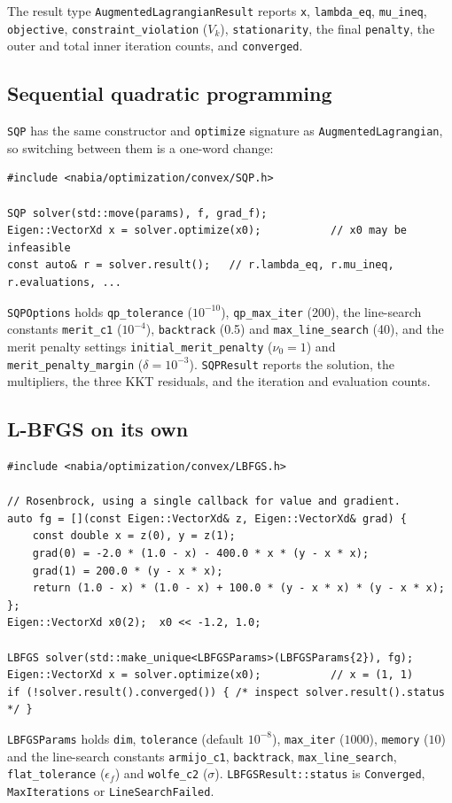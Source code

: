 \documentclass[11pt,a4paper]{article}
\begin{document}
The result type \texttt{AugmentedLagrangianResult} reports \texttt{x},
\texttt{lambda\_eq}, \texttt{mu\_ineq}, \texttt{objective},
\texttt{constraint\_violation} ($V_k$),
\texttt{stationarity}, the final \texttt{penalty}, the outer and total inner
iteration counts, and \texttt{converged}.

\subsection{Sequential quadratic programming}
\texttt{SQP} has the same constructor and
\texttt{optimize} signature as \texttt{AugmentedLagrangian}, so switching
between them is a one-word change:
\begin{lstlisting}
#include <nabia/optimization/convex/SQP.h>

SQP solver(std::move(params), f, grad_f);
Eigen::VectorXd x = solver.optimize(x0);           // x0 may be infeasible
const auto& r = solver.result();   // r.lambda_eq, r.mu_ineq, r.evaluations, ...
\end{lstlisting}
\texttt{SQPOptions} holds \texttt{qp\_tolerance} ($10^{-10}$), \texttt{qp\_max\_iter} (200),
the line-search constants \texttt{merit\_c1} ($10^{-4}$), \texttt{backtrack} (0.5) and
\texttt{max\_line\_search} (40), and the merit penalty settings \texttt{initial\_merit\_penalty} ($\nu_0=1$) and
\texttt{merit\_penalty\_margin} ($\delta=10^{-3}$). \texttt{SQPResult} reports the solution,
the multipliers, the three KKT residuals, and the iteration and evaluation counts.

\subsection{L-BFGS on its own}
\begin{lstlisting}
#include <nabia/optimization/convex/LBFGS.h>

// Rosenbrock, using a single callback for value and gradient.
auto fg = [](const Eigen::VectorXd& z, Eigen::VectorXd& grad) {
    const double x = z(0), y = z(1);
    grad(0) = -2.0 * (1.0 - x) - 400.0 * x * (y - x * x);
    grad(1) = 200.0 * (y - x * x);
    return (1.0 - x) * (1.0 - x) + 100.0 * (y - x * x) * (y - x * x);
};
Eigen::VectorXd x0(2);  x0 << -1.2, 1.0;

LBFGS solver(std::make_unique<LBFGSParams>(LBFGSParams{2}), fg);
Eigen::VectorXd x = solver.optimize(x0);           // x = (1, 1)
if (!solver.result().converged()) { /* inspect solver.result().status */ }
\end{lstlisting}
\texttt{LBFGSParams} holds \texttt{dim}, \texttt{tolerance} (default
$10^{-8}$), \texttt{max\_iter} ($1000$), \texttt{memory} ($10$) and the line-search
constants \texttt{armijo\_c1}, \texttt{backtrack}, \texttt{max\_line\_search}, \texttt{flat\_tolerance}
($\epsilon_f$) and \texttt{wolfe\_c2} ($\sigma$).
\texttt{LBFGSResult::status} is \texttt{Converged}, \texttt{MaxIterations} or
\texttt{LineSearchFailed}.
\end{document}
